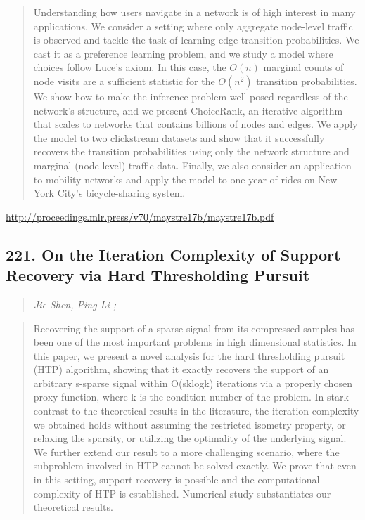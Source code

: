 \documentclass{article}
\begin{document}
\begin{quote}
    Understanding how users navigate in a network is of high interest in many applications. We consider a setting where only aggregate node-level traffic is observed and tackle the task of learning edge transition probabilities. We cast it as a preference learning problem, and we study a model where choices follow Luce’s axiom. In this case, the $O(n)$ marginal counts of node visits are a sufficient statistic for the $O(n^2)$ transition probabilities. We show how to make the inference problem well-posed regardless of the network’s structure, and we present ChoiceRank, an iterative algorithm that scales to networks that contains billions of nodes and edges. We apply the model to two clickstream datasets and show that it successfully recovers the transition probabilities using only the network structure and marginal (node-level) traffic data. Finally, we also consider an application to mobility networks and apply the model to one year of rides on New York City’s bicycle-sharing system.  \end{quote}

\href{http://proceedings.mlr.press/v70/maystre17b/maystre17b.pdf}{http://proceedings.mlr.press/v70/maystre17b/maystre17b.pdf}

\subsection{221. On the Iteration Complexity of Support Recovery via Hard Thresholding Pursuit}

\begin{quote}
\footnotesize{\textit{Jie Shen, Ping Li ;}}
\end{quote}

\begin{quote}
    Recovering the support of a sparse signal from its compressed samples has been one of the most important problems in high dimensional statistics. In this paper, we present a novel analysis for the hard thresholding pursuit (HTP) algorithm, showing that it exactly recovers the support of an arbitrary s-sparse signal within O(sklogk) iterations via a properly chosen proxy function, where k is the condition number of the problem. In stark contrast to the theoretical results in the literature, the iteration complexity we obtained holds without assuming the restricted isometry property, or relaxing the sparsity, or utilizing the optimality of the underlying signal. We further extend our result to a more challenging scenario, where the subproblem involved in HTP cannot be solved exactly. We prove that even in this setting, support recovery is possible and the computational complexity of HTP is established. Numerical study substantiates our theoretical results.  \end{quote}
\end{document}
